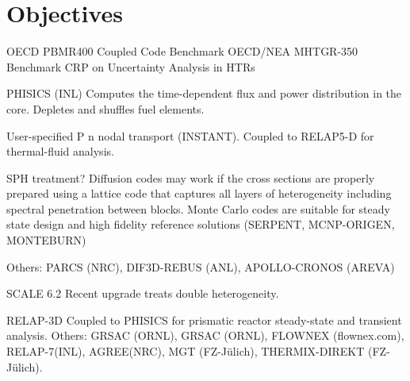 \documentclass[11pt,letterpaper]{article}
\begin{document}
\section{Objectives}



OECD PBMR400 Coupled Code Benchmark %
OECD/NEA MHTGR-350 Benchmark %
CRP on Uncertainty Analysis in HTRs %
\cite{gougar_htgr_2016}

PHISICS (INL) %
Computes the time-dependent flux and power distribution in the core.
Depletes and shuffles fuel elements.

User-specified P n nodal transport (INSTANT). Coupled to
RELAP5-D for thermal-fluid analysis.

SPH treatment?
Diffusion codes may work if the cross sections are properly prepared using a lattice code that captures all layers of heterogeneity including spectral penetration between blocks. Monte Carlo codes are suitable for steady state design and high fidelity reference solutions (SERPENT, MCNP-ORIGEN, MONTEBURN)

Others: PARCS (NRC), DIF3D-REBUS (ANL), APOLLO-CRONOS (AREVA)
\cite{gougar_htgr_2016}

SCALE 6.2
Recent upgrade treats double heterogeneity.
\cite{gougar_htgr_2016}

RELAP-3D
Coupled to PHISICS for prismatic reactor steady-state and transient analysis.
Others: GRSAC (ORNL), GRSAC (ORNL), FLOWNEX (flownex.com), RELAP-7(INL), AGREE(NRC), MGT (FZ-Jülich),
THERMIX-DIREKT (FZ-Jülich).

\cite{gougar_htgr_2016}






\pagebreak


\end{document}
